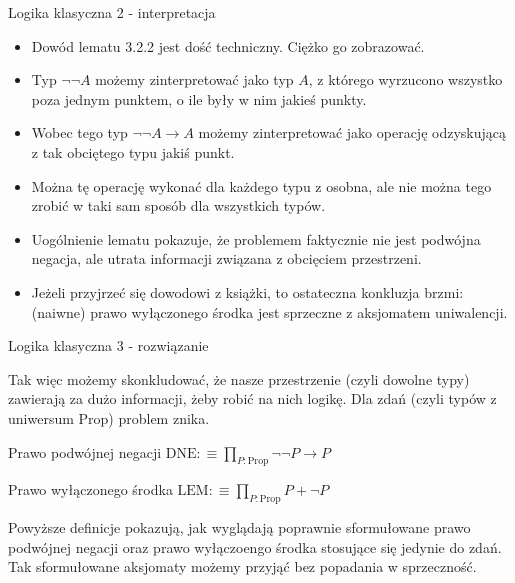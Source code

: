 \documentclass{beamer}
\newcommand{\defn}{:\equiv}
\newcommand{\Prop}{\text{Prop}}
\begin{document}
\begin{frame}{Logika klasyczna 2 - interpretacja}
\begin{itemize}
	\item Dowód lematu 3.2.2 jest dość techniczny. Ciężko go zobrazować.
	\item Typ $\neg\neg A$ możemy zinterpretować jako typ $A$, z którego wyrzucono wszystko poza jednym punktem, o ile były w nim jakieś punkty.
	\item Wobec tego typ $\neg\neg A \to A$ możemy zinterpretować jako operację odzyskującą z tak obciętego typu jakiś punkt.
	\item Można tę operację wykonać dla każdego typu z osobna, ale nie można tego zrobić w taki sam sposób dla wszystkich typów.
	\item Uogólnienie lematu pokazuje, że problemem faktycznie nie jest podwójna negacja, ale utrata informacji związana z obcięciem przestrzeni.
	\item Jeżeli przyjrzeć się dowodowi z książki, to ostateczna konkluzja brzmi: (naiwne) prawo wyłączonego środka jest sprzeczne z aksjomatem uniwalencji.
\end{itemize}
\end{frame}

\begin{frame}{Logika klasyczna 3 - rozwiązanie}

Tak więc możemy skonkludować, że nasze przestrzenie (czyli dowolne typy) zawierają za dużo informacji, żeby robić na nich logikę. Dla zdań (czyli typów z uniwersum $\Prop$) problem znika.

\begin{block}{Prawo podwójnej negacji}
$\text{DNE} \defn \prod_{P : \Prop} \neg\neg P \to P$
\end{block}

\begin{block}{Prawo wyłączonego środka}
$\text{LEM} \defn \prod_{P : \Prop} P + \neg P$
\end{block}

Powyższe definicje pokazują, jak wyglądają poprawnie sformułowane prawo podwójnej negacji oraz prawo wyłączoengo środka stosujące się jedynie do zdań. Tak sformułowane aksjomaty możemy przyjąć bez popadania w sprzeczność.

\end{frame}
\end{document}
